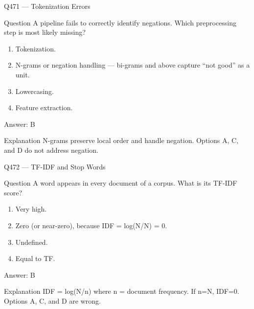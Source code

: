\documentclass[aspectratio=169,8pt]{beamer}
\begin{document}
	\begin{frame}{Q471 --- Tokenization Errors}
		\begin{block}{Question}
			A pipeline fails to correctly identify negations. Which preprocessing step is most likely missing?
			\begin{enumerate}
				\item Tokenization.
				\item N-grams or negation handling --- bi-grams and above capture ``not good'' as a unit.
				\item Lowercasing.
				\item Feature extraction.
			\end{enumerate}
		\end{block}
		\begin{exampleblock}{Answer: B}\end{exampleblock}
		\begin{block}{Explanation}
			N-grams preserve local order and handle negation. Options A, C, and D do not address negation.
		\end{block}
	\end{frame}
	
	\begin{frame}{Q472 --- TF-IDF and Stop Words}
		\begin{block}{Question}
			A word appears in every document of a corpus. What is its TF-IDF score?
			\begin{enumerate}
				\item Very high.
				\item Zero (or near-zero), because IDF = log(N/N) = 0.
				\item Undefined.
				\item Equal to TF.
			\end{enumerate}
		\end{block}
		\begin{exampleblock}{Answer: B}\end{exampleblock}
		\begin{block}{Explanation}
			IDF = log(N/n) where n = document frequency. If n=N, IDF=0. Options A, C, and D are wrong.
		\end{block}
	\end{frame}
	
\end{document}
